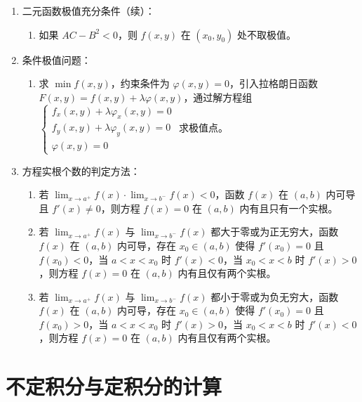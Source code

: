 \documentclass[UTF8]{ctexart}
\theoremstyle{remark}
\begin{document}
\begin{enumerate}
	\item 二元函数极值充分条件（续）：
	\begin{enumerate}
		\item 如果 \(AC - B^2 < 0\)，则 \(f(x, y)\) 在 \((x_0, y_0)\) 处不取极值。
	\end{enumerate}
	
	\item 条件极值问题：
	\begin{enumerate}
		\item 求 \(\min f(x, y)\)，约束条件为 \(\varphi(x, y) = 0\)，引入拉格朗日函数 \(F(x, y) = f(x, y) + \lambda \varphi(x, y)\)，通过解方程组 \(\begin{cases} f_x(x, y) + \lambda \varphi_x(x, y) = 0 \\ f_y(x, y) + \lambda \varphi_y(x, y) = 0 \\ \varphi(x, y) = 0 \end{cases}\) 求极值点。
	\end{enumerate}
	
	\item 方程实根个数的判定方法：
	\begin{enumerate}
		\item 若 \(\lim_{x \to a^+} f(x) \cdot \lim_{x \to b^-} f(x) < 0\)，函数 \(f(x)\) 在 \((a, b)\) 内可导且 \(f'(x) \neq 0\)，则方程 \(f(x) = 0\) 在 \((a, b)\) 内有且只有一个实根。
		\item 若 \(\lim_{x \to a^+} f(x)\) 与 \(\lim_{x \to b^-} f(x)\) 都大于零或为正无穷大，函数 \(f(x)\) 在 \((a, b)\) 内可导，存在 \(x_0 \in (a, b)\) 使得 \(f'(x_0) = 0\) 且 \(f(x_0) < 0\)，当 \(a < x < x_0\) 时 \(f'(x) < 0\)，当 \(x_0 < x < b\) 时 \(f'(x) > 0\)，则方程 \(f(x) = 0\) 在 \((a, b)\) 内有且仅有两个实根。
		\item 若 \(\lim_{x \to a^+} f(x)\) 与 \(\lim_{x \to b^-} f(x)\) 都小于零或为负无穷大，函数 \(f(x)\) 在 \((a, b)\) 内可导，存在 \(x_0 \in (a, b)\) 使得 \(f'(x_0) = 0\) 且 \(f(x_0) > 0\)，当 \(a < x < x_0\) 时 \(f'(x) > 0\)，当 \(x_0 < x < b\) 时 \(f'(x) < 0\)，则方程 \(f(x) = 0\) 在 \((a, b)\) 内有且仅有两个实根。
	\end{enumerate}
\end{enumerate}
	\section{不定积分与定积分的计算}
\end{document}
